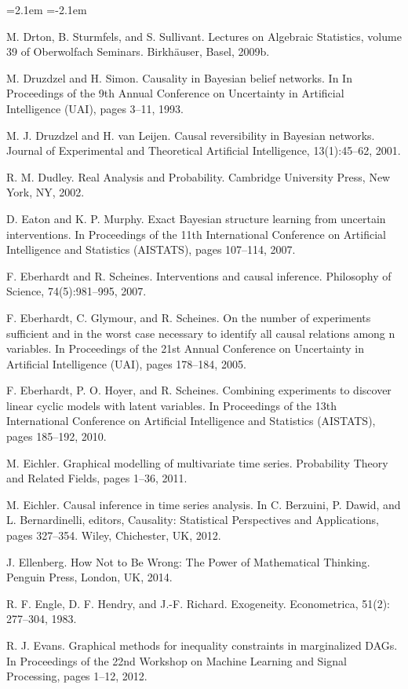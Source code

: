 \begin{list}{}{\leftmargin=2.1em
 \itemindent=-2.1em\parsep=0pt\itemsep=3pt}
\item M. Drton, B. Sturmfels, and S. Sullivant. Lectures on Algebraic Statistics, volume 39 of Oberwolfach Seminars. Birkhäuser, Basel, 2009b.
\item M. Druzdzel and H. Simon. Causality in Bayesian belief networks. In In Proceedings of the 9th Annual Conference on Uncertainty in Artificial Intelligence (UAI), pages 3--11, 1993.
\item M. J. Druzdzel and H. van Leijen. Causal reversibility in Bayesian networks. Journal of Experimental and Theoretical Artificial Intelligence, 13(1):45--62, 2001.
\item R. M. Dudley. Real Analysis and Probability. Cambridge University Press, New York, NY, 2002.
\item D. Eaton and K. P. Murphy. Exact Bayesian structure learning from uncertain interventions. In Proceedings of the 11th International Conference on Artificial Intelligence and Statistics (AISTATS), pages 107--114, 2007.
\item F. Eberhardt and R. Scheines. Interventions and causal inference. Philosophy of Science, 74(5):981--995, 2007.
\item F. Eberhardt, C. Glymour, and R. Scheines. On the number of experiments sufficient and in the worst case necessary to identify all causal relations among n variables. In Proceedings of the 21st Annual Conference on Uncertainty in Artificial Intelligence (UAI), pages 178--184, 2005.
\item F. Eberhardt, P. O. Hoyer, and R. Scheines. Combining experiments to discover linear cyclic models with latent variables. In Proceedings of the 13th International Conference on Artificial Intelligence and Statistics (AISTATS), pages 185--192, 2010.
\item M. Eichler. Graphical modelling of multivariate time series. Probability Theory and Related Fields, pages 1--36, 2011.
\item M. Eichler. Causal inference in time series analysis. In C. Berzuini, P. Dawid, and L. Bernardinelli, editors, Causality: Statistical Perspectives and Applications, pages 327--354. Wiley, Chichester, UK, 2012.
\item J. Ellenberg. How Not to Be Wrong: The Power of Mathematical Thinking. Penguin Press, London, UK, 2014.
\item R. F. Engle, D. F. Hendry, and J.-F. Richard. Exogeneity. Econometrica, 51(2): 277--304, 1983.
\item R. J. Evans. Graphical methods for inequality constraints in marginalized DAGs. In Proceedings of the 22nd Workshop on Machine Learning and Signal Processing, pages 1--12, 2012.

\end{list}
